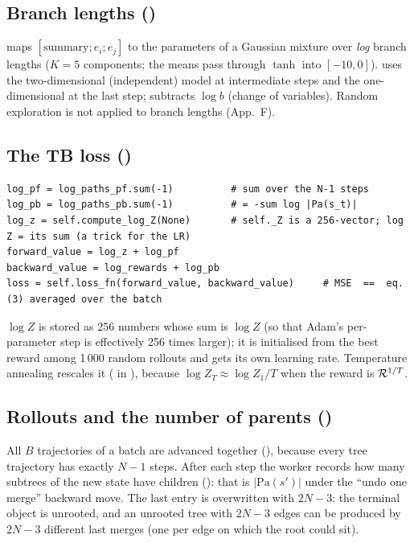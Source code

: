 \subsection{Branch lengths ()}
 maps $[\text{summary};e_i;e_j]$ to the parameters of a Gaussian mixture over \emph{log} branch lengths ($K=5$ components; the means pass through $\tanh$ into $[-10,0]$).  uses the two-dimensional (independent) model at intermediate steps and the one-dimensional  at the last step;  subtracts $\log b$ (change of variables). Random exploration is not applied to branch lengths (App.~F).

\subsection{The TB loss ()}
\begin{lstlisting}
log_pf = log_paths_pf.sum(-1)          # sum over the N-1 steps
log_pb = log_paths_pb.sum(-1)          # = -sum log |Pa(s_t)|
log_z = self.compute_log_Z(None)       # self._Z is a 256-vector; log Z = its sum (a trick for the LR)
forward_value = log_z + log_pf
backward_value = log_rewards + log_pb
loss = self.loss_fn(forward_value, backward_value)     # MSE  ==  eq. (3) averaged over the batch
\end{lstlisting}
$\log Z$ is stored as 256 numbers whose sum is $\log Z$ (so that Adam's per-parameter step is effectively 256 times larger); it is initialised from the best reward among 1\,000 random rollouts and gets its own learning rate. Temperature annealing rescales it ( in ), because $\log Z_T\approx\log Z_1/T$ when the reward is $\mathcal{R}^{1/T}$.

\subsection{Rollouts and the number of parents ()}
All $B$ trajectories of a batch are advanced together (), because every tree trajectory has exactly $N-1$ steps. After each step the worker records how many subtrees of the new state have children (): that is $|\mathrm{Pa}(s')|$ under the ``undo one merge'' backward move. The last entry is overwritten with $2N-3$: the terminal object is unrooted, and an unrooted tree with $2N-3$ edges can be produced by $2N-3$ different last merges (one per edge on which the root could sit).

